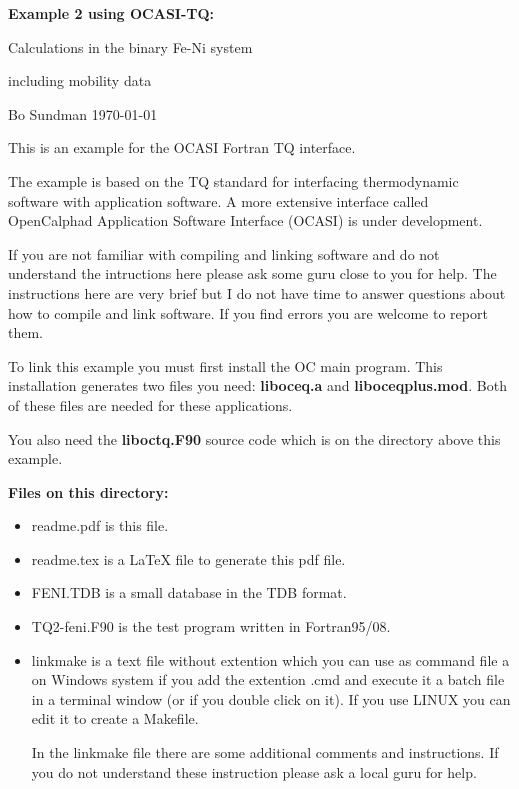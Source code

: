 \documentclass[12pt]{article}
\begin{document}
\begin{center}
{\Large \bf Example 2 using OCASI-TQ:

Calculations in the binary Fe-Ni system

including mobility data

}

\bigskip

Bo Sundman \today

\end{center}

This is an example for the OCASI Fortran TQ interface.

The example is based on the TQ standard for interfacing thermodynamic
software with application software.  A more extensive interface called
OpenCalphad Application Software Interface (OCASI) is under
development.

If you are not familiar with compiling and linking software and do not
understand the intructions here please ask some guru close to you for
help.  The instructions here are very brief but I do not have time to
answer questions about how to compile and link software.  If you find
errors you are welcome to report them.

To link this example you must first install the OC main program.  This
installation generates two files you need: {\bf liboceq.a} and {\bf
  liboceqplus.mod}.  Both of these files are needed for these
applications.

You also need the {\bf liboctq.F90} source code which is on the
directory above this example.

\bigskip

{\bf Files on this directory:}
\begin{itemize}
\item readme.pdf is this file.

\item readme.tex is a LaTeX file to generate this pdf file.

\item FENI.TDB is a small database in the TDB format.

\item TQ2-feni.F90 is the test program written in Fortran95/08.

\item linkmake is a text file without extention which you can use as
  command file a on Windows system if you add the extention .cmd and
  execute it a batch file in a terminal window (or if you double click
  on it).  If you use LINUX you can edit it to create a Makefile.

  In the linkmake file there are some additional comments and
  instructions.  If you do not understand these instruction please ask
  a local guru for help.
\end{itemize}
\end{document}
